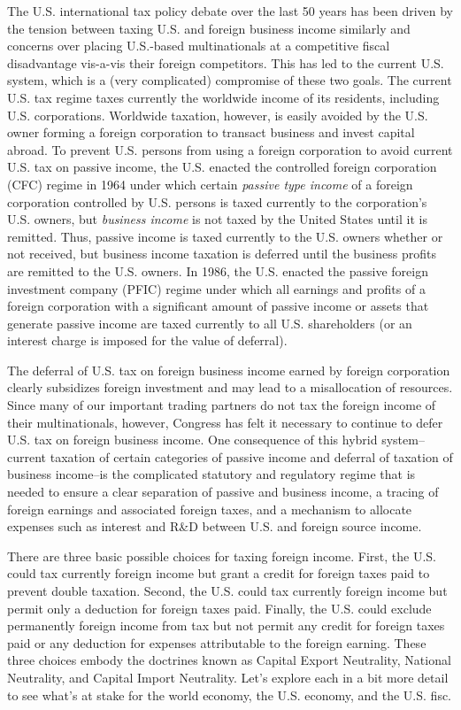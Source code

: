 The U.S. international tax policy debate over the last 50 years has been driven by the tension between taxing U.S. and foreign business income similarly and concerns over placing U.S.-based multinationals at a competitive fiscal disadvantage vis-a-vis their foreign competitors.  This has led to the current U.S. system, which is a (very complicated) compromise of these two goals.  The current U.S. tax regime taxes currently the worldwide income of its residents, including U.S. corporations.  Worldwide taxation, however, is easily avoided by the U.S. owner forming a foreign corporation to transact business and invest capital abroad.  To prevent U.S. persons from using a foreign corporation to avoid current U.S. tax on passive income, the U.S. enacted the controlled foreign corporation (CFC) regime in 1964 under which certain \emph{passive type income} of a foreign corporation controlled by U.S. persons is taxed currently to the corporation's U.S. owners, but \emph{business income} is not taxed by the United States until it is remitted.  Thus, passive income is taxed currently to the U.S. owners whether or not received, but business income taxation is deferred until the business profits are remitted to the U.S. owners.  In 1986, the U.S. enacted the passive foreign investment company (PFIC) regime under which all earnings and profits of a foreign corporation with a significant amount of passive income or assets that generate passive income are taxed currently to all U.S. shareholders (or an interest charge is imposed for the value of deferral).  

The deferral of U.S. tax on foreign business income earned by foreign corporation clearly subsidizes foreign investment and may lead to a misallocation of resources.  Since many of our important trading partners do not tax the foreign income of their multinationals, however, Congress has felt it necessary to continue to defer U.S. tax on foreign business income.  One consequence of this hybrid system--current taxation of certain categories of passive income and deferral of taxation of business income--is the complicated statutory and regulatory regime that is needed to ensure a clear separation of passive and business income, a tracing of foreign earnings and associated foreign taxes, and a mechanism to allocate expenses such as interest and R\&D between U.S. and foreign source income.  

There are three basic possible choices for taxing foreign income.  First, the U.S. could tax currently foreign income but grant a credit for foreign taxes paid to prevent double taxation.  Second, the U.S. could tax currently foreign income but permit only a deduction for foreign taxes paid.  Finally, the U.S. could exclude permanently foreign income from tax but not permit any credit for foreign taxes paid or any deduction for expenses attributable to the foreign earning.  These three choices embody the doctrines known as Capital Export Neutrality, National Neutrality, and Capital Import Neutrality.  Let's explore each in a bit more detail to see what's at stake for the world economy, the U.S. economy, and the U.S. fisc.


